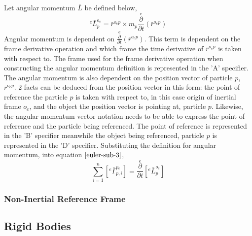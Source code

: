 \documentclass[a4paper, 12pt]{report}
\begin{document}
\begin{center}
Let angular momentum $\bar{L}$ be defined below,
$${}^{e}\bar{L}^{o_{e}}_{p} = \bar{r}^{o_{e}p}\times m_{p}\overset{e}{\frac{\partial}{\partial t}}\left(\bar{r}^{o_{e}p}\right)$$
Angular momentum is dependent on $\displaystyle \overset{e}{\frac{\partial}{\partial t}}\left(\bar{r}^{o_{e}p}\right)$. This term is dependent on the frame derivative operation and which frame the time derivative of $\displaystyle \bar{r}^{o_{e}p}$ is taken with respect to. The frame used for the frame derivative operation when constructing the angular momentum definition is represented in the 'A' specifier. The angular momentum is also dependent on the position vector of particle $p$, $\displaystyle \bar{r}^{o_{e}p}$. $2$ facts can be deduced from the position vector in this form: the point of reference the particle $p$ is taken with respect to, in this case origin of inertial frame $o_{e}$, and the object the position vector is pointing at, particle $p$. Likewise, the angular momentum vector notation needs to be able to express the point of reference and the particle being referenced. The point of reference is represented in the 'B' specifier meanwhile the object being referenced, particle $p$ is represented in the 'D' specifier. Substituting the definition for angular momentum, into equation $\ref{euler-sub-3}$,
$$\sum^{n}_{i = 1}\left[{}^{e}\bar{\Gamma}^{o_{e}}_{p,i}\right] = \overset{e}{\frac{\partial}{\partial t}}\left[{}^{e}\bar{L}^{o_{e}}_{p}\right]$$
\subsubsection{Non-Inertial Reference Frame}
\begin{comment}
\end{comment}
\subsection{Rigid Bodies}
\begin{comment}
Kind of incomplete, more information about the colinear argument need to be made
\end{comment}

\end{center}
\end{document}
